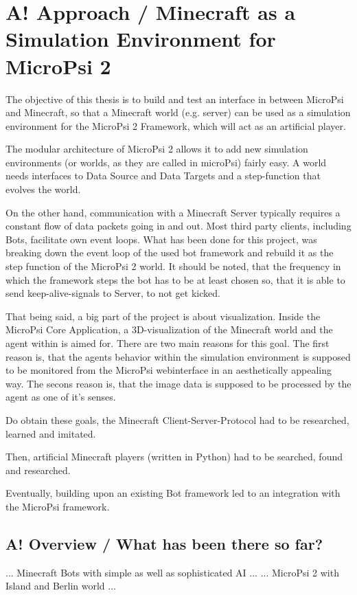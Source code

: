 \chapter{A! Approach / Minecraft as a Simulation Environment for MicroPsi 2}

The objective of this thesis is to build and test an interface in between MicroPsi and Minecraft, so that a Minecraft world (e.g. server) can be used as a simulation environment for the MicroPsi 2 Framework, which will act as an artificial player.

The modular architecture of MicroPsi 2 allows it to add new simulation environments (or worlds, as they are called in microPsi) fairly easy. A world needs interfaces to Data Source and Data Targets and a step-function that evolves the world.

On the other hand, communication with a Minecraft Server typically requires a constant flow of data packets going in and out. Most third party clients, including Bots, facilitate own event loops. What has been done for this project, was breaking down the event loop of the used bot framework and rebuild it as the step function of the MicroPsi 2 world. It should be noted, that the frequency in which the framework steps the bot has to be at least chosen so, that it is able to send keep-alive-signals to Server, to not get kicked.

That being said, a big part of the project is about visualization. Inside the MicroPsi Core Application, a 3D-visualization of the Minecraft world and the agent within is aimed for. There are two main reasons for this goal. The first reason is, that the agents behavior within the simulation environment is supposed to be monitored from the MicroPsi webinterface in an aesthetically appealing way. The secons reason is, that the image data is supposed to be processed by the agent as one of it's senses.

Do obtain these goals, the Minecraft Client-Server-Protocol had to be researched, learned and imitated.

Then, artificial Minecraft players (written in Python) had to be searched, found and researched.

Eventually, building upon an existing Bot framework led to an integration with the MicroPsi framework.

\section{A! Overview / What has been there so far?}
... Minecraft Bots with simple as well as sophisticated AI ...
... MicroPsi 2 with Island and Berlin world ...

